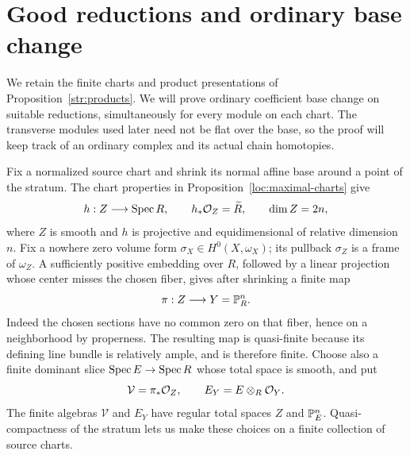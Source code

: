 \section{Good reductions and ordinary base change}\label{bc:section}
\label{sec:base-change}

We retain the finite charts and product presentations of
Proposition~\ref{str:products}.  We will prove ordinary coefficient base
change on suitable reductions, simultaneously for every module on each
chart.  The transverse modules used later need not be flat over the base,
so the proof will keep track of an ordinary complex and its actual chain
homotopies.

Fix a normalized source chart and shrink its normal affine base around a
point of the stratum.  The chart properties in
Proposition~\ref{loc:maximal-charts} give
\[
 h:Z\longrightarrow\operatorname{Spec} R,\qquad
 h_*\mathcal O_Z=\widetilde R,\qquad \dim Z=2n,
\]
where $Z$ is smooth and $h$ is projective and equidimensional of relative
dimension $n$.  Fix a nowhere zero volume form
$\sigma_X\in H^0(X,\omega_X)$; its pullback $\sigma_Z$ is a frame of
$\omega_Z$.  A sufficiently positive embedding over $R$, followed by a
linear projection whose center misses the chosen fiber, gives after
shrinking a finite map
\begin{equation}\label{bc:finite-projection}
 \pi:Z\longrightarrow Y=\mathbb P^n_R.
\end{equation}
Indeed the chosen sections have no common zero on that fiber, hence on
a neighborhood by properness.  The resulting map is quasi-finite because
its defining line bundle is relatively ample, and is therefore finite.
Choose also a finite dominant slice
$\operatorname{Spec} E\to\operatorname{Spec} R$ whose total space is smooth, and put
\[
                 \mathcal V=\pi_*\mathcal O_Z,\qquad
                 E_Y=E\otimes_R\mathcal O_Y.
\]
The finite algebras $\mathcal V$ and $E_Y$ have regular total spaces
$Z$ and $\mathbb P^n_E$.  Quasi-compactness of the stratum lets us make these
choices on a finite collection of source charts.

